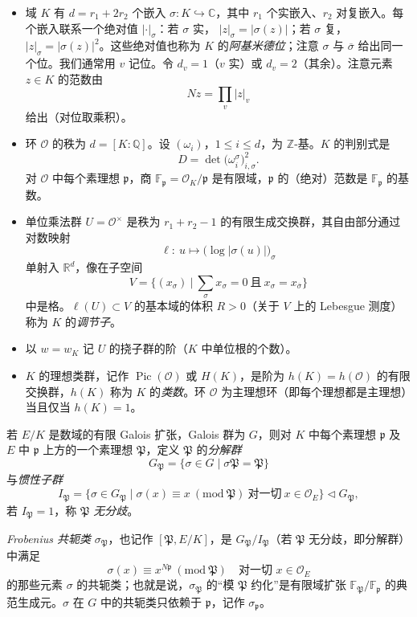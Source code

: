 \begin{itemize}[leftmargin=1.6em]
\item 域 $K$ 有 $d=r_1+2r_2$ 个嵌入 $\sigma\colon K\hookrightarrow\mathbb{C}$，其中 $r_1$ 个实嵌入、$r_2$ 对复嵌入。每个嵌入联系一个绝对值 $|\cdot|_{\sigma}$：若 $\sigma$ 实，
$|z|_{\sigma}=|\sigma(z)|$；若 $\sigma$ 复，$|z|_{\sigma}=|\sigma(z)|^{2}$。这些绝对值也称为 $K$ 的\emph{阿基米德位}；注意 $\sigma$ 与 $\overline{\sigma}$ 给出同一个位。我们通常用 $v$ 记位。令 $d_v=1$（$v$ 实）或 $d_v=2$（其余）。注意元素 $z\in K$ 的范数由
\[
Nz=\prod_{v}|z|_{v}
\]
给出（对位取乘积）。
\item 环 $\mathcal{O}$ 的秩为 $d=[K:\mathbb{Q}]$。设 $(\omega_i)$，$1\le i\le d$，为 $\mathbb{Z}$-基。$K$ 的判别式是
\[
D=\det\bigl(\omega_i^{\sigma}\bigr)_{i,\sigma}^{2}.
\]
对 $\mathcal{O}$ 中每个素理想 $\mathfrak{p}$，商 $\mathbb{F}_{\mathfrak{p}}=\mathcal{O}_K/\mathfrak{p}$ 是有限域，$\mathfrak{p}$ 的（绝对）范数是 $\mathbb{F}_{\mathfrak{p}}$ 的基数。
\item 单位乘法群 $U=\mathcal{O}^{\times}$ 是秩为 $r_1+r_2-1$ 的有限生成交换群，其自由部分通过对数映射
\[
\ell\colon\ u\mapsto\bigl(\log|\sigma(u)|\bigr)_{\sigma}
\]
单射入 $\mathbb{R}^{d}$，像在子空间
\[
V=\bigl\{(x_{\sigma})\ \big|\ \sum_{\sigma}x_{\sigma}=0\ \text{且}\ x_{\sigma}=x_{\overline{\sigma}}\bigr\}
\]
中是格。$\ell(U)\subset V$ 的基本域的体积 $R>0$（关于 $V$ 上的 Lebesgue 测度）称为 $K$ 的\emph{调节子}。
\item 以 $w=w_K$ 记 $U$ 的挠子群的阶（$K$ 中单位根的个数）。
\item $K$ 的理想类群，记作 $\operatorname{Pic}(\mathcal{O})$ 或 $H(K)$，是阶为 $h(K)=h(\mathcal{O})$ 的有限交换群，$h(K)$ 称为 $K$ 的\emph{类数}。环 $\mathcal{O}$ 为主理想环（即每个理想都是主理想）当且仅当 $h(K)=1$。
\end{itemize}

若 $E/K$ 是数域的有限 Galois 扩张，Galois 群为 $G$，则对 $K$ 中每个素理想 $\mathfrak{p}$ 及 $E$ 中 $\mathfrak{p}$ 上方的一个素理想 $\mathfrak{P}$，定义 $\mathfrak{P}$ 的\emph{分解群}
\[
G_{\mathfrak{P}}=\{\sigma\in G\mid \sigma\mathfrak{P}=\mathfrak{P}\}
\]
与\emph{惯性子群}
\[
I_{\mathfrak{P}}=\{\sigma\in G_{\mathfrak{P}}\mid
\sigma(x)\equiv x\ (\mathrm{mod}\ \mathfrak{P})\ \text{对一切}\ x\in\mathcal{O}_E\}\lhd G_{\mathfrak{P}},
\]
若 $I_{\mathfrak{P}}=1$，称 $\mathfrak{P}$ \emph{无分歧}。

\emph{Frobenius 共轭类} $\sigma_{\mathfrak{P}}$，也记作 $[\mathfrak{P},E/K]$，是 $G_{\mathfrak{P}}/I_{\mathfrak{P}}$（若 $\mathfrak{P}$ 无分歧，即分解群）中满足
\[
\sigma(x)\equiv x^{N\mathfrak{p}}\ (\mathrm{mod}\ \mathfrak{P})
\quad\text{对一切 } x\in\mathcal{O}_E
\]
的那些元素 $\sigma$ 的共轭类；也就是说，$\sigma_{\mathfrak{P}}$ 的“模 $\mathfrak{P}$ 约化”是有限域扩张 $\mathbb{F}_{\mathfrak{P}}/\mathbb{F}_{\mathfrak{p}}$ 的典范生成元。$\sigma$ 在 $G$ 中的共轭类只依赖于 $\mathfrak{p}$，记作 $\sigma_{\mathfrak{p}}$。

